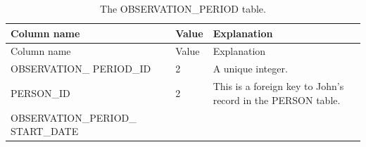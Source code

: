 \documentclass[10.5pt]{book}
\theoremstyle{definition}
\theoremstyle{definition}
\theoremstyle{definition}
\theoremstyle{remark}
\begin{document}
\begin{longtable}[]{@{}lll@{}}
\caption{\label{tab:johnOp} The OBSERVATION\_PERIOD table.}\tabularnewline
\toprule
\begin{minipage}[b]{0.29\columnwidth}\raggedright\strut
Column name\strut
\end{minipage} & \begin{minipage}[b]{0.14\columnwidth}\raggedright\strut
Value\strut
\end{minipage} & \begin{minipage}[b]{0.48\columnwidth}\raggedright\strut
Explanation\strut
\end{minipage}\tabularnewline
\midrule
\endfirsthead
\toprule
\begin{minipage}[b]{0.29\columnwidth}\raggedright\strut
Column name\strut
\end{minipage} & \begin{minipage}[b]{0.14\columnwidth}\raggedright\strut
Value\strut
\end{minipage} & \begin{minipage}[b]{0.48\columnwidth}\raggedright\strut
Explanation\strut
\end{minipage}\tabularnewline
\midrule
\endhead
\begin{minipage}[t]{0.29\columnwidth}\raggedright\strut
OBSERVATION\_ PERIOD\_ID\strut
\end{minipage} & \begin{minipage}[t]{0.14\columnwidth}\raggedright\strut
2\strut
\end{minipage} & \begin{minipage}[t]{0.48\columnwidth}\raggedright\strut
A unique integer.\strut
\end{minipage}\tabularnewline
\begin{minipage}[t]{0.29\columnwidth}\raggedright\strut
PERSON\_ID\strut
\end{minipage} & \begin{minipage}[t]{0.14\columnwidth}\raggedright\strut
2\strut
\end{minipage} & \begin{minipage}[t]{0.48\columnwidth}\raggedright\strut
This is a foreign key to John's record in the PERSON table.\strut
\end{minipage}\tabularnewline
\begin{minipage}[t]{0.29\columnwidth}\raggedright\strut
OBSERVATION\_PERIOD\_ START\_DATE\strut
\end{minipage} & \begin{minipage}[t]{0.14\columnwidth}\raggedright\strut

\end{minipage}
\end{longtable}
\end{document}
